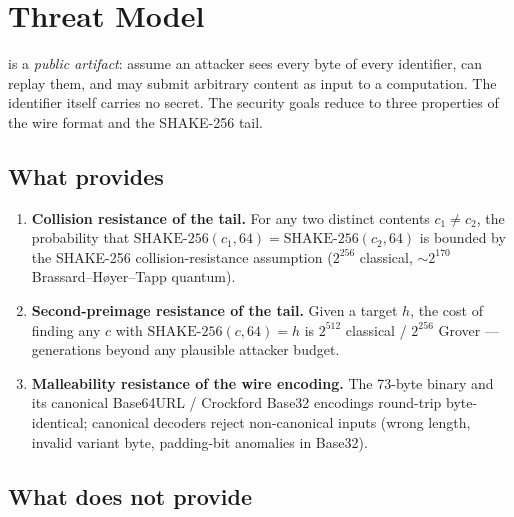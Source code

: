 \section{Threat Model}
\label{sec:threat-model}

\pqhash{} is a \emph{public artifact}: assume an attacker sees every byte of every identifier, can replay them, and may submit arbitrary content as input to a \pqhash{} computation. The identifier itself carries no secret. The security goals reduce to three properties of the wire format and the SHAKE-256 \citep{fips202} tail.

\subsection{What \pqhash{} provides}

\begin{enumerate}
  \item \textbf{Collision resistance of the tail.} For any two distinct contents $c_1 \ne c_2$, the probability that $\mathrm{SHAKE\text{-}256}(c_1, 64) = \mathrm{SHAKE\text{-}256}(c_2, 64)$ is bounded by the SHAKE-256 collision-resistance assumption ($2^{256}$ classical, $\sim 2^{170}$ Brassard--H{\o}yer--Tapp \citep{bht1998} quantum).
  \item \textbf{Second-preimage resistance of the tail.} Given a target $h$, the cost of finding any $c$ with $\mathrm{SHAKE\text{-}256}(c, 64) = h$ is $2^{512}$ classical / $2^{256}$ Grover \citep{grover1996} --- generations beyond any plausible attacker budget.
  \item \textbf{Malleability resistance of the wire encoding.} The 73-byte binary and its canonical Base64URL / Crockford Base32 encodings round-trip byte-identical; canonical decoders reject non-canonical inputs (wrong length, invalid variant byte, padding-bit anomalies in Base32).
\end{enumerate}

\subsection{What \pqhash{} does not provide}

